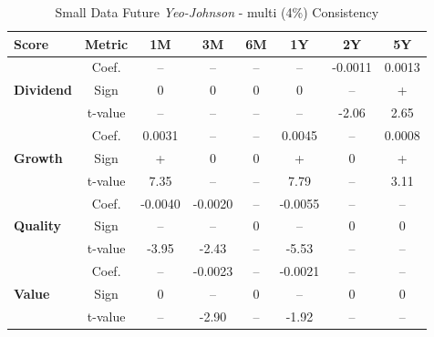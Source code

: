 \documentclass[11pt,english,a4paper,hidelinks]{book}
\begin{document}
\begin{table}[H]
    \centering
    \caption{Small Data Future \textit{Yeo-Johnson} - \acrshort{multi} (4\%) Consistency}
    \begin{tabular}{lccccccc}
        \toprule
        \textbf{Score} & \textbf{Metric} & \textbf{1M} & \textbf{3M} & \textbf{6M} & \textbf{1Y} & \textbf{2Y} & \textbf{5Y} \\
        \midrule
        \multirow{3}{*}{\textbf{Dividend}} 
            & Coef.   & --      & --      & --      & --      & -0.0011 & 0.0013 \\
            & Sign    & 0       & 0       & 0       & 0       & --      & +      \\
            & t-value & --      & --      & --      & --      & -2.06   & 2.65   \\
        \midrule
        \multirow{3}{*}{\textbf{Growth}} 
            & Coef.   & 0.0031  & --      & --      & 0.0045  & --      & 0.0008 \\
            & Sign    & +       & 0       & 0       & +       & 0       & +      \\
            & t-value & 7.35    & --      & --      & 7.79    & --      & 3.11   \\
        \midrule
        \multirow{3}{*}{\textbf{Quality}} 
            & Coef.   & -0.0040 & -0.0020 & --      & -0.0055 & --      & --     \\
            & Sign    & --      & --      & 0       & --      & 0       & 0      \\
            & t-value & -3.95   & -2.43   & --      & -5.53   & --      & --     \\
        \midrule
        \multirow{3}{*}{\textbf{Value}} 
            & Coef.   & --      & -0.0023 & --      & -0.0021 & --      & --     \\
            & Sign    & 0       & --      & 0       & --      & 0       & 0      \\
            & t-value & --      & -2.90   & --      & -1.92   & --      & --     \\
        \bottomrule
    \end{tabular}
    \label{tab:first_linear_regression_results_scores_gaussian}
\end{table}
\end{document}
